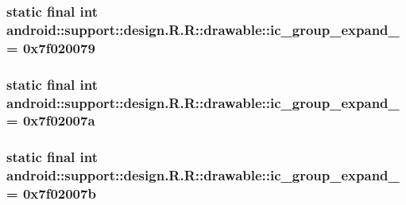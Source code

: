 \hypertarget{classandroid_1_1support_1_1design_1_1_r_1_1drawable_6ff56f23910155d7a0cb8e60c2f1197d}{
\subsubsection[{ic\_\-group\_\-expand\_\-10}]{\setlength{\rightskip}{0pt plus 5cm}static final int android::support::design.R.R::drawable::ic\_\-group\_\-expand\_ = 0x7f020079}}
\label{classandroid_1_1support_1_1design_1_1_r_1_1drawable_6ff56f23910155d7a0cb8e60c2f1197d}


\hypertarget{classandroid_1_1support_1_1design_1_1_r_1_1drawable_0596ee179ec863889334eb46a9f40bc7}{
\subsubsection[{ic\_\-group\_\-expand\_\-11}]{\setlength{\rightskip}{0pt plus 5cm}static final int android::support::design.R.R::drawable::ic\_\-group\_\-expand\_ = 0x7f02007a}}
\label{classandroid_1_1support_1_1design_1_1_r_1_1drawable_0596ee179ec863889334eb46a9f40bc7}


\hypertarget{classandroid_1_1support_1_1design_1_1_r_1_1drawable_6e78b2190d4fc639e6c6a42ecbcfb4cf}{
\subsubsection[{ic\_\-group\_\-expand\_\-12}]{\setlength{\rightskip}{0pt plus 5cm}static final int android::support::design.R.R::drawable::ic\_\-group\_\-expand\_ = 0x7f02007b}}
\label{classandroid_1_1support_1_1design_1_1_r_1_1drawable_6e78b2190d4fc639e6c6a42ecbcfb4cf}


